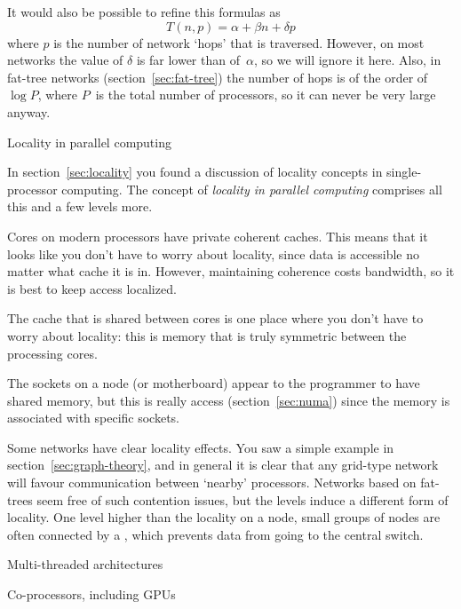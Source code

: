 It would also be possible to refine this formulas as
\[ T(n,p) = \alpha+\beta n+\delta p \]
where $p$ is the number of network `hops' that is traversed. However,
on most networks the value of $\delta$ is far lower than of~$\alpha$,
so we will ignore it here. Also, in fat-tree networks
(section~\ref{sec:fat-tree}) the number of hops is of the order of
$\log P$, where $P$~is the total number of processors, so it can never
be very large anyway.

 {Locality in parallel computing}
\label{sec:parallel-local}

In section~\ref{sec:locality} you found a discussion of 
locality concepts in single-processor computing.
The concept of \emph{locality in parallel computing}
comprises all this and a few levels more.

 Cores on modern processors have
private coherent caches. This means that
 it looks like you don't have to worry about locality, since data
  is accessible no matter what cache it is in. However, maintaining coherence
  costs bandwidth, so it is best to keep access localized.

 The cache that is shared between cores
is one place where you don't have to worry about locality: this is memory that
is truly symmetric between the processing cores.

 The sockets on a node (or motherboard)
appear to the programmer to have shared memory, but this is really 
 access (section~\ref{sec:numa}) since the memory is
associated with specific sockets.

 Some networks have clear locality effects.
You saw a simple example in section~\ref{sec:graph-theory}, and 
in general it is clear that any grid-type network will favour communication
between `nearby' processors. Networks based on fat-trees seem free of such
contention issues, but the levels induce a different form of locality.
One level higher than the locality on a node, small groups of nodes
are often connected by a , 
which prevents data from going to the central switch.


 {Multi-threaded architectures}
\label{sec:mta}


 {Co-processors, including GPUs}
\label{sec:copprocessor}

